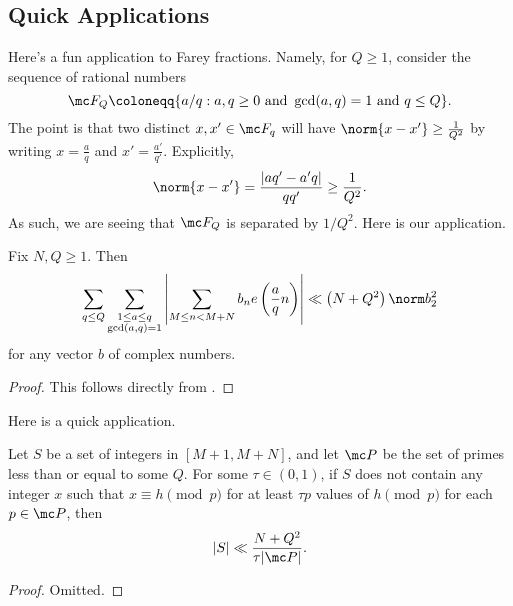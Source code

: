\documentclass[../notes.tex]{subfiles}
\begin{document}
\subsection{Quick Applications}
Here's a fun application to Farey fractions. Namely, for $Q\ge1$, consider the sequence of rational numbers
\[\mc F_Q\coloneqq\{a/q:a,q\ge0\text{ and }\gcd(a,q)=1\text{ and }q\le Q\}.\]
The point is that two distinct $x,x'\in\mc F_q$ will have $\norm{x-x'}\ge\frac1{Q^2}$ by writing $x=\frac aq$ and $x'=\frac{a'}{q'}$. Explicitly,
\[\norm{x-x'}=\frac{|aq'-a'q|}{qq'}\ge\frac1{Q^2}.\]
As such, we are seeing that $\mc F_Q$ is separated by $1/Q^2$. Here is our application.
\begin{corollary} \label{cor:quick-large-sieve}
	Fix $N,Q\ge1$. Then
	\[\sum_{q\le Q}\sum_{\substack{1\le a\le q\\\gcd(a,q)=1}}\left|\sum_{M\le n<M+N}b_ne\left(\frac aqn\right)\right|\ll\left(N+Q^2\right)\norm b_2^2\]
	for any vector $b$ of complex numbers.
\end{corollary}
\begin{proof}
	This follows directly from .
\end{proof}
Here is a quick application.
\begin{theorem} \label{thm:reyni}
	Let $S$ be a set of integers in $[M+1,M+N]$, and let $\mc P$ be the set of primes less than or equal to some $Q$. For some $\tau\in(0,1)$, if $S$ does not contain any integer $x$ such that $x\equiv h\pmod p$ for at least $\tau p$ values of $h\pmod p$ for each $p\in\mc P$, then
	\[|S|\ll\frac{N+Q^2}{\tau|\mc P|}.\]
\end{theorem}
\begin{proof}
	Omitted.
\end{proof}
\end{document}
